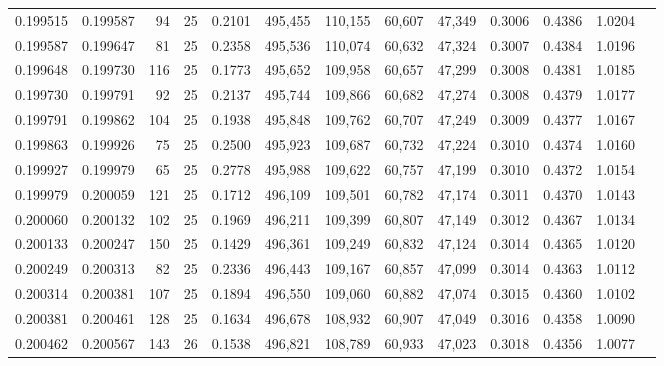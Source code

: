 \begin{tabular}{rrrrrrrrrrrrr}
0.199515 & 0.199587 &    94 &  25 &                                     0.2101 & 495,455 & 110,155 &  60,607 &  47,349 & 0.3006 & 0.4386 & 1.0204 \\
0.199587 & 0.199647 &    81 &  25 &                                     0.2358 & 495,536 & 110,074 &  60,632 &  47,324 & 0.3007 & 0.4384 & 1.0196 \\
0.199648 & 0.199730 &   116 &  25 &                                     0.1773 & 495,652 & 109,958 &  60,657 &  47,299 & 0.3008 & 0.4381 & 1.0185 \\
0.199730 & 0.199791 &    92 &  25 &                                     0.2137 & 495,744 & 109,866 &  60,682 &  47,274 & 0.3008 & 0.4379 & 1.0177 \\
0.199791 & 0.199862 &   104 &  25 &                                     0.1938 & 495,848 & 109,762 &  60,707 &  47,249 & 0.3009 & 0.4377 & 1.0167 \\
0.199863 & 0.199926 &    75 &  25 &                                     0.2500 & 495,923 & 109,687 &  60,732 &  47,224 & 0.3010 & 0.4374 & 1.0160 \\
0.199927 & 0.199979 &    65 &  25 &                                     0.2778 & 495,988 & 109,622 &  60,757 &  47,199 & 0.3010 & 0.4372 & 1.0154 \\
0.199979 & 0.200059 &   121 &  25 &                                     0.1712 & 496,109 & 109,501 &  60,782 &  47,174 & 0.3011 & 0.4370 & 1.0143 \\
0.200060 & 0.200132 &   102 &  25 &                                     0.1969 & 496,211 & 109,399 &  60,807 &  47,149 & 0.3012 & 0.4367 & 1.0134 \\
0.200133 & 0.200247 &   150 &  25 &                                     0.1429 & 496,361 & 109,249 &  60,832 &  47,124 & 0.3014 & 0.4365 & 1.0120 \\
0.200249 & 0.200313 &    82 &  25 &                                     0.2336 & 496,443 & 109,167 &  60,857 &  47,099 & 0.3014 & 0.4363 & 1.0112 \\
0.200314 & 0.200381 &   107 &  25 &                                     0.1894 & 496,550 & 109,060 &  60,882 &  47,074 & 0.3015 & 0.4360 & 1.0102 \\
0.200381 & 0.200461 &   128 &  25 &                                     0.1634 & 496,678 & 108,932 &  60,907 &  47,049 & 0.3016 & 0.4358 & 1.0090 \\
0.200462 & 0.200567 &   143 &  26 &                                     0.1538 & 496,821 & 108,789 &  60,933 &  47,023 & 0.3018 & 0.4356 & 1.0077 \\

\end{tabular}
